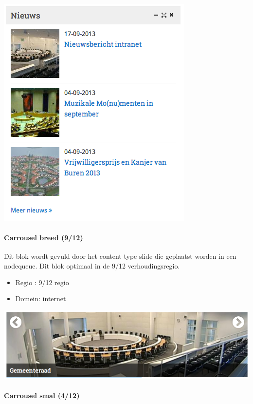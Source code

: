 \begin{center}
	\includegraphics[scale=0.5]{img/blokken/nieuwsteaserimg.png}
\end{center}

\paragraph{Carrousel breed (9/12)}

Dit blok wordt gevuld door het content type slide die geplaatst worden in een nodequeue. Dit blok optimaal in de 9/12 verhoudingsregio.

\begin{itemize}
\item Regio : 9/12 regio
\item Domein: internet
\end{itemize}

\begin{center}
	\includegraphics[scale=0.5]{img/blokken/carrouselbreed.png}
\end{center}

\paragraph{Carrousel smal (4/12)}

